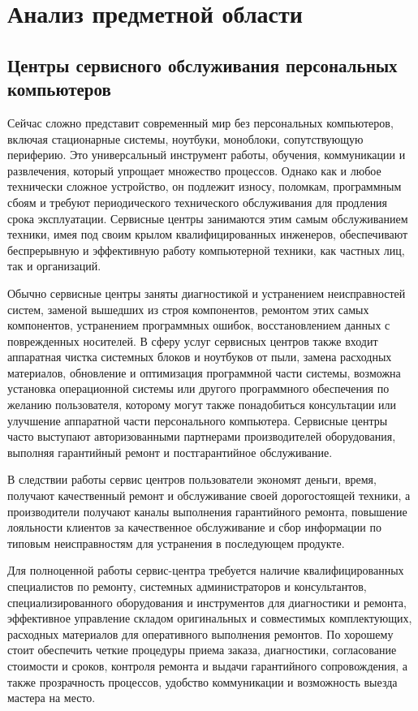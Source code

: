 \section{Анализ предметной области}
\subsection{Центры сервисного обслуживания персональных компьютеров}

Сейчас сложно представит современный мир без персональных компьютеров, включая стационарные системы, ноутбуки, моноблоки, сопутствующую периферию. Это универсальный инструмент работы, обучения, коммуникации и развлечения, который упрощает множество процессов. Однако как и любое технически сложное устройство, он подлежит износу, поломкам, программным сбоям и требуют периодического технического обслуживания для продления срока эксплуатации. Сервисные центры занимаются этим самым обслуживанием техники, имея под своим крылом квалифицированных инженеров, обеспечивают беспрерывную и эффективную работу компьютерной техники, как частных лиц, так и организаций. 

Обычно сервисные центры заняты диагностикой и устранением неисправностей систем, заменой вышедших из строя компонентов, ремонтом этих самых компонентов, устранением программных ошибок, восстановлением данных с поврежденных носителей. В сферу услуг сервисных центров также входит аппаратная чистка системных блоков и ноутбуков от пыли, замена расходных материалов, обновление и оптимизация программной части системы, возможна установка операционной системы или другого программного обеспечения по желанию пользователя, которому могут также понадобиться консультации или улучшение аппаратной части персонального компьютера. Сервисные центры часто выступают авторизованными партнерами производителей оборудования, выполняя гарантийный ремонт и постгарантийное обслуживание.

В следствии работы сервис центров пользователи экономят деньги, время, получают качественный ремонт и обслуживание своей дорогостоящей техники, а производители получают каналы выполнения гарантийного ремонта, повышение лояльности клиентов за качественное обслуживание и сбор информации по типовым неисправностям для устранения в последующем продукте.

Для полноценной работы сервис-центра требуется наличие квалифицированных специалистов по ремонту, системных администраторов и консультантов, специализированного оборудования и инструментов для диагностики и ремонта, эффективное управление складом оригинальных и совместимых комплектующих, расходных материалов для оперативного выполнения ремонтов. По хорошему стоит обеспечить четкие процедуры приема заказа, диагностики, согласование стоимости и сроков, контроля ремонта и выдачи гарантийного сопровождения, а также прозрачность процессов, удобство коммуникации и возможность выезда мастера на место. 	

